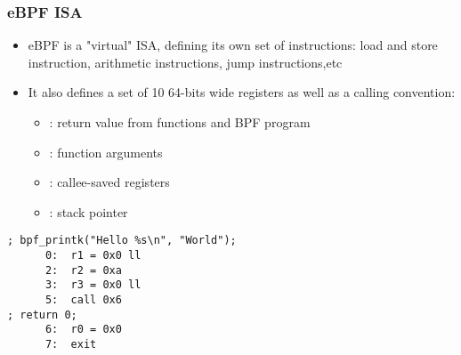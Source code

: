 \begin{frame}[fragile]
  \frametitle{eBPF ISA}
  \begin{itemize}
    \item eBPF is a "virtual" ISA, defining its own set of instructions: load
    and store instruction, arithmetic instructions, jump instructions,etc
    \item It also defines a set of 10 64-bits wide registers as well as a
    calling convention:
    \begin{itemize}
      \item {}: return value from functions and BPF program
      \item {}: function arguments
      \item {}: callee-saved registers
      \item {}: stack pointer
    \end{itemize}
  \end{itemize}
  \begin{block}{}
    \begin{verbatim}
; bpf_printk("Hello %s\n", "World");
      0:  r1 = 0x0 ll
      2:  r2 = 0xa
      3:  r3 = 0x0 ll
      5:  call 0x6
; return 0;
      6:  r0 = 0x0
      7:  exit
    \end{verbatim}
  \end{block}
\end{frame}

